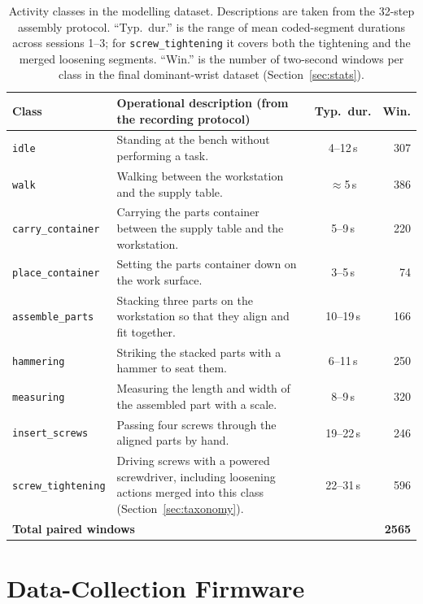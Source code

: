 \begin{table}[htbp]
\centering
\small
\setlength{\tabcolsep}{3.5pt}
\renewcommand{\arraystretch}{1.15}
\begin{tabularx}{\textwidth}{|p{2.4cm}|X|c|r|}
\hline
\textbf{Class} & \textbf{Operational description (from the recording protocol)}
 & \textbf{Typ.\ dur.} & \textbf{Win.} \\
\hline
\texttt{idle} & Standing at the bench without performing a task. & 4--12\,s & 307 \\
\texttt{walk} & Walking between the workstation and the supply table. & $\approx$5\,s & 386 \\
\texttt{carry\_\allowbreak container} & Carrying the parts container between the supply table and the workstation. & 5--9\,s & 220 \\
\texttt{place\_\allowbreak container} & Setting the parts container down on the work surface. & 3--5\,s & 74 \\
\texttt{assemble\_\allowbreak parts} & Stacking three parts on the workstation so that they align and fit together. & 10--19\,s & 166 \\
\texttt{hammering} & Striking the stacked parts with a hammer to seat them. & 6--11\,s & 250 \\
\texttt{measuring} & Measuring the length and width of the assembled part with a scale. & 8--9\,s & 320 \\
\texttt{insert\_\allowbreak screws} & Passing four screws through the aligned parts by hand. & 19--22\,s & 246 \\
\texttt{screw\_\allowbreak tightening} & Driving screws with a powered screwdriver, including loosening actions merged into this class (Section~\ref{sec:taxonomy}). & 22--31\,s & 596 \\
\hline
\multicolumn{3}{|l|}{\textbf{Total paired windows}} & \textbf{2565} \\
\hline
\end{tabularx}
\caption{Activity classes in the modelling dataset. Descriptions are taken from
the 32-step assembly protocol. ``Typ.\ dur.'' is the range of mean coded-segment
durations across sessions 1--3; for \texttt{screw\_tightening} it
covers both the tightening and the merged loosening segments. ``Win.'' is the
number of two-second windows per class in the final dominant-wrist dataset
(Section~\ref{sec:stats}).}
\label{tab:activity-classes}
\end{table}

\section{Data-Collection Firmware}
\label{sec:firmware}

